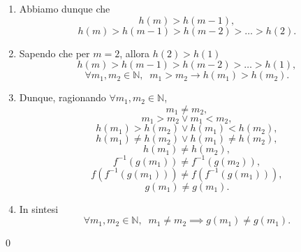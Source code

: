 \begin{demonstration}
\begin{enumerate}[label=(\roman*)]
\begin{enumerate}[label=\arabic*.]
            \item Abbiamo dunque che
                \[ h\left(m\right) > h\left(m-1\right), \]
                \[ h\left(m\right) > h\left(m-1\right) > h\left(m-2\right) > \ldots > h\left(2\right). \]
            \item Sapendo che per $m=2$, allora $h\left(2\right)>h\left(1\right)$\label{pas:ord}
                \[ h\left(m\right) > h\left(m-1\right) > h\left(m-2\right) > \ldots > h\left(1\right), \]
                \[ \forall m_1, m_2\in\mathbb{N}, \;\;m_1>m_2 \rightarrow h\left(m_1\right) > h\left(m_2\right). \]

            \item Dunque, ragionando $\forall m_1, m_2\in\mathbb{N}$,
                \[
                    m_1 \neq m_2,\]\[
                    m_1 > m_2 \lor m_1<m_2 ,\]\[
                    h\left(m_1\right) > h\left(m_2\right)\lor h\left(m_1\right) < h\left(m_2\right) ,\]\[
                    h\left(m_1\right) \neq h\left(m_2\right)\lor h\left(m_1\right) \neq h\left(m_2\right) ,\]\[
                    h\left(m_1\right) \neq h\left(m_2\right), \]\[
                    f^{-1}\left(g\left(m_1\right)\right) \neq f^{-1}\left(g\left(m_2\right)\right), \]\[
                    f\left(f^{-1}\left(g\left(m_1\right)\right)\right) \neq f\left(f^{-1}\left(g\left(m_1\right)\right)\right), \]\[
                    g\left(m_1\right) \neq g\left(m_1\right).
                \]

            \item In sintesi  
                \[
                    \forall m_1, m_2\in\mathbb{N}, \;\; m_1 \neq m_2 \implies g\left(m_1\right) \neq g\left(m_1\right).
                \]

            

        \end{enumerate}
        \qed


\end{enumerate}
\end{demonstration}
